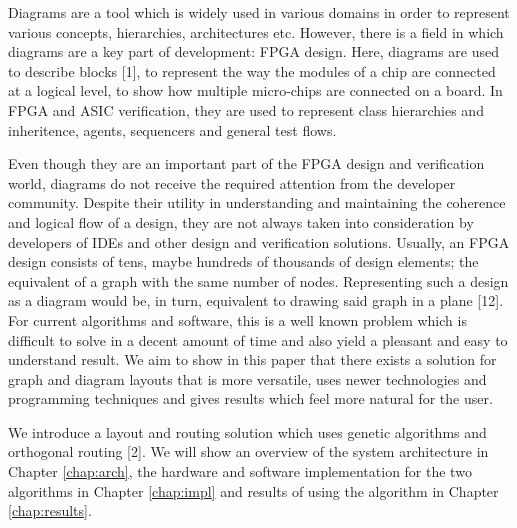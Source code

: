 Diagrams are a tool which is widely used in various domains in order to represent
various concepts, hierarchies, architectures etc. However, there is a field in 
which diagrams are a key part of development: FPGA design. Here, diagrams are used
to describe blocks [1], to represent the way the modules of a chip are connected at a 
logical level, to show how multiple micro-chips are connected on a board. In FPGA 
and ASIC verification, they are used to represent class hierarchies and inheritence, 
agents, sequencers and general test flows.

Even though they are an important part of the FPGA design and verification world, 
diagrams do not receive the required attention from the developer community. Despite 
their utility in understanding and maintaining the coherence and logical flow of a
design, they are not always taken into consideration by developers of IDEs and other 
design and verification solutions. Usually, an FPGA design consists of tens, maybe hundreds 
of thousands of design elements; the equivalent of a graph with the same number of nodes. 
Representing such a design as a diagram would be, in turn, equivalent to drawing said graph 
in a plane [12]. For current algorithms and software, this is a well known problem which is 
difficult to solve in a decent amount of time and also yield a pleasant and easy to 
understand result. We aim to show in this paper that there exists a solution for graph 
and diagram layouts that is more versatile, uses newer technologies and programming 
techniques and gives results which feel more natural for the user.

We introduce a layout and routing solution which uses genetic algorithms and orthogonal
routing [2]. We will show an overview of the system architecture in Chapter \ref{chap:arch}, 
the hardware and software implementation for the two algorithms in Chapter \ref{chap:impl} 
and results of using the algorithm in Chapter \ref{chap:results}. 

